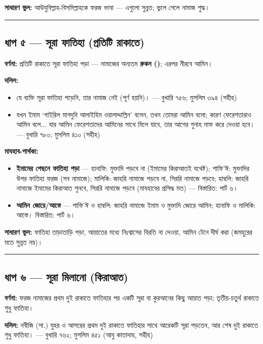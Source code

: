 \textbf{সাধারণ ভুল:} আউযুবিল্লাহ-বিসমিল্লাহকে ফরজ ভাবা — এগুলো সুন্নত; ভুলে গেলে নামাজ শুদ্ধ।

\medskip\hrule\medskip

\subsection*{ধাপ ৫ — সূরা ফাতিহা (প্রতিটি রাকাতে)}

\textbf{বর্ণনা:} প্রতিটি রাকাতে সূরা ফাতিহা পড়া — নামাজের অন্যতম \textbf{রুকন ()}; এরপর নীরবে আমিন।

\textbf{দলিল:}
\begin{itemize}
\item {}যে ব্যক্তি সূরা ফাতিহা পড়েনি, তার নামাজ নেই (পূর্ণ হয়নি)। — বুখারি ৭৫৬; মুসলিম ৩৯৪ (সহীহ)
\item {}যখন ইমাম ‘গাইরিল মাগদুবি আলাইহিম ওয়ালাদ্দাল্লিন’ বলেন, তখন তোমরা আমিন বলো; কারণ ফেরেশতারাও আমিন বলে... যার আমিন ফেরেশতাদের আমিনের সাথে মিলে যাবে, তার আগের গুনাহ মাফ করে দেওয়া হবে। — বুখারি ৭৮০; মুসলিম ৪১০ (সহীহ)
\end{itemize}
\textbf{মাযহাব-পার্থক্য:}
\begin{itemize}
\item \textbf{ইমামের পেছনে ফাতিহা পড়া} — হানাফি: মুক্তাদি পড়বে না (ইমামের কিরাআতই যথেষ্ট); শাফি'ঈ: মুক্তাদির উপর ফাতিহা ফরজ (সব নামাজে); মালিকি: জাহরি নামাজে পড়বে না, সিররি নামাজে পড়বে; হাম্বলি: জাহরি নামাজে ইমামের কিরাআত শুনবে, সিররি নামাজে পড়বে (মাযহাবের প্রসিদ্ধ মত) — বিস্তারিত: পার্ট ৬।
\item \textbf{আমিন জোরে/আস্তে} — শাফি'ঈ ও হাম্বলি: জাহরি নামাজে ইমাম ও মুক্তাদি জোরে আমিন; হানাফি ও মালিকি: আস্তে। বিস্তারিত: পার্ট ৬।
\end{itemize}
\textbf{সাধারণ ভুল:} ফাতিহা তাড়াতাড়ি পড়া, আয়াতের মধ্যে নিঃশ্বাসের বিরতি না দেওয়া, আমিন টেনে দীর্ঘ করা (জমহুরের মতে সুন্নত নয়)।

\medskip\hrule\medskip

\subsection*{ধাপ ৬ — সূরা মিলানো (কিরাআত)}

\textbf{বর্ণনা:} ফরজ নামাজের প্রথম দুই রাকাতে ফাতিহার পর একটি সূরা বা কুরআনের কিছু আয়াত পড়া; তৃতীয়-চতুর্থ রাকাতে শুধু ফাতিহা।

\textbf{দলিল:} নবীজি (সা.) যুহর ও আসরের প্রথম দুই রাকাতে ফাতিহার সাথে আরেকটি সূরা পড়তেন, আর শেষ দুই রাকাতে শুধু ফাতিহা। — বুখারি ৭৬২; মুসলিম ৪৫১ (আবু কাতাদাহ, সহীহ)

